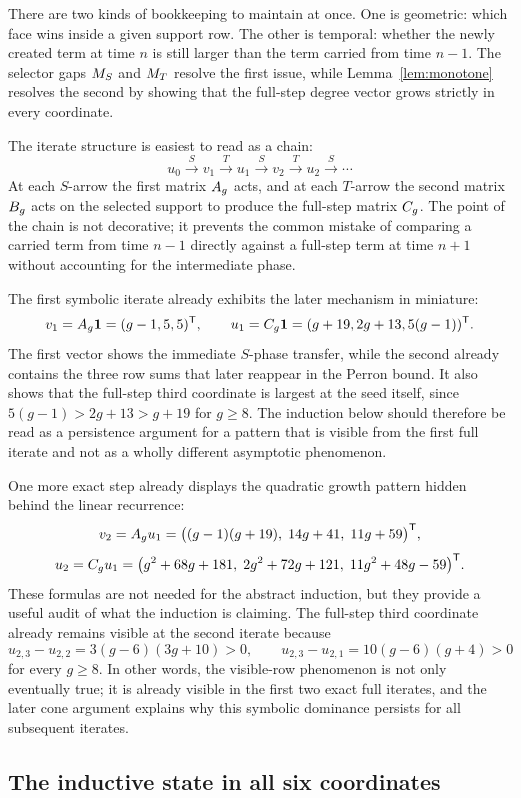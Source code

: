 \documentclass[11pt]{article}
\theoremstyle{remark}
\numberwithin{equation}{section}
\begin{document}
There are two kinds of bookkeeping to maintain at once.  One is geometric:
which face wins inside a given support row.  The other is temporal: whether the
newly created term at time \(n\) is still larger than the term carried from
time \(n-1\).  The selector gaps \(M_S\) and \(M_T\) resolve the first issue,
while Lemma~\ref{lem:monotone} resolves the second by showing that the full-step
degree vector grows strictly in every coordinate.

The iterate structure is easiest to read as a chain:
\[
u_0 \xrightarrow{S} v_1 \xrightarrow{T} u_1 \xrightarrow{S} v_2
\xrightarrow{T} u_2 \xrightarrow{S} \cdots
\]
At each \(S\)-arrow the first matrix \(A_g\) acts, and at each \(T\)-arrow the
second matrix \(B_g\) acts on the selected support to produce the full-step
matrix \(C_g\).  The point of the chain is not decorative; it prevents the
common mistake of comparing a carried term from time \(n-1\) directly against a
full-step term at time \(n+1\) without accounting for the intermediate phase.

The first symbolic iterate already exhibits the later mechanism in miniature:
\[
v_1=A_g\mathbf{1}=(g-1,5,5)^{\mathsf T},
\qquad
u_1=C_g\mathbf{1}=(g+19,2g+13,5(g-1))^{\mathsf T}.
\]
The first vector shows the immediate \(S\)-phase transfer, while the second
already contains the three row sums that later reappear in the Perron bound.
It also shows that the full-step third coordinate is largest at the seed
itself, since \(5(g-1)>2g+13>g+19\) for \(g\geq 8\).  The induction below
should therefore be read as a persistence argument for a pattern that is
visible from the first full iterate and not as a wholly different asymptotic
phenomenon.

One more exact step already displays the quadratic growth pattern hidden behind
the linear recurrence:
\[
v_2=A_g u_1=
\bigl((g-1)(g+19),\;14g+41,\;11g+59\bigr)^{\mathsf T},
\]
\[
u_2=C_g u_1=
\bigl(g^2+68g+181,\;2g^2+72g+121,\;11g^2+48g-59\bigr)^{\mathsf T}.
\]
These formulas are not needed for the abstract induction, but they provide a
useful audit of what the induction is claiming.  The full-step third coordinate
already remains visible at the second iterate because
\[
u_{2,3}-u_{2,2}=3(g-6)(3g+10)>0,
\qquad
u_{2,3}-u_{2,1}=10(g-6)(g+4)>0
\]
for every \(g\geq 8\).  In other words, the visible-row phenomenon is not only
eventually true; it is already visible in the first two exact full iterates,
and the later cone argument explains why this symbolic dominance persists for
all subsequent iterates.

\subsection{The inductive state in all six coordinates}\label{sec:six-state}
\end{document}
